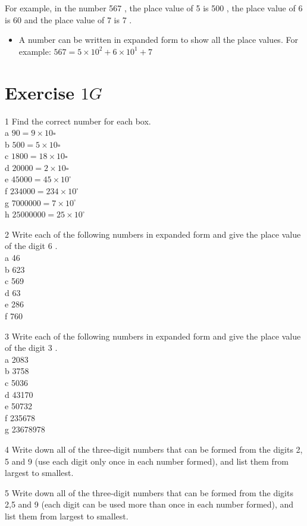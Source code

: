 \documentclass[10pt]{article}
\begin{document}
For example, in the number 567 , the place value of 5 is 500 , the place value of 6 is 60 and the place value of 7 is 7 .

\begin{itemize}
  \item A number can be written in expanded form to show all the place values. For example: \(567=5 \times 10^{2}+6 \times 10^{1}+7\)
\end{itemize}

\section*{Exercise \(1 G\)}
1 Find the correct number for each box.\\
a \(90=9 \times 10 \square\)\\
b \(500=5 \times 10 \square\)\\
c \(1800=18 \times 10 \square\)\\
d \(20000=2 \times 10 \square\)\\
e \(45000=45 \times 10^{\square}\)\\
f \(234000=234 \times 10^{\square}\)\\
g \(7000000=7 \times 10^{\square}\)\\
h \(25000000=25 \times 10^{\square}\)

2 Write each of the following numbers in expanded form and give the place value of the digit 6 .\\
a 46\\
b 623\\
c 569\\
d 63\\
e 286\\
f 760

3 Write each of the following numbers in expanded form and give the place value of the digit 3 .\\
a 2083\\
b 3758\\
c 5036\\
d 43170\\
e 50732\\
f 235678\\
g 23678978

4 Write down all of the three-digit numbers that can be formed from the digits 2, 5 and 9 (use each digit only once in each number formed), and list them from largest to smallest.

5 Write down all of the three-digit numbers that can be formed from the digits 2,5 and 9 (each digit can be used more than once in each number formed), and list them from largest to smallest.
\end{document}
